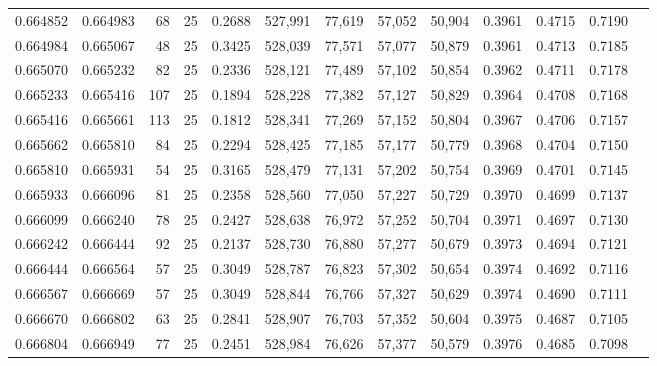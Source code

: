 \begin{tabular}{rrrrrrrrrrrrr}
0.664852 & 0.664983 &    68 &  25 &                                     0.2688 & 527,991 &  77,619 &  57,052 &  50,904 & 0.3961 & 0.4715 & 0.7190 \\
0.664984 & 0.665067 &    48 &  25 &                                     0.3425 & 528,039 &  77,571 &  57,077 &  50,879 & 0.3961 & 0.4713 & 0.7185 \\
0.665070 & 0.665232 &    82 &  25 &                                     0.2336 & 528,121 &  77,489 &  57,102 &  50,854 & 0.3962 & 0.4711 & 0.7178 \\
0.665233 & 0.665416 &   107 &  25 &                                     0.1894 & 528,228 &  77,382 &  57,127 &  50,829 & 0.3964 & 0.4708 & 0.7168 \\
0.665416 & 0.665661 &   113 &  25 &                                     0.1812 & 528,341 &  77,269 &  57,152 &  50,804 & 0.3967 & 0.4706 & 0.7157 \\
0.665662 & 0.665810 &    84 &  25 &                                     0.2294 & 528,425 &  77,185 &  57,177 &  50,779 & 0.3968 & 0.4704 & 0.7150 \\
0.665810 & 0.665931 &    54 &  25 &                                     0.3165 & 528,479 &  77,131 &  57,202 &  50,754 & 0.3969 & 0.4701 & 0.7145 \\
0.665933 & 0.666096 &    81 &  25 &                                     0.2358 & 528,560 &  77,050 &  57,227 &  50,729 & 0.3970 & 0.4699 & 0.7137 \\
0.666099 & 0.666240 &    78 &  25 &                                     0.2427 & 528,638 &  76,972 &  57,252 &  50,704 & 0.3971 & 0.4697 & 0.7130 \\
0.666242 & 0.666444 &    92 &  25 &                                     0.2137 & 528,730 &  76,880 &  57,277 &  50,679 & 0.3973 & 0.4694 & 0.7121 \\
0.666444 & 0.666564 &    57 &  25 &                                     0.3049 & 528,787 &  76,823 &  57,302 &  50,654 & 0.3974 & 0.4692 & 0.7116 \\
0.666567 & 0.666669 &    57 &  25 &                                     0.3049 & 528,844 &  76,766 &  57,327 &  50,629 & 0.3974 & 0.4690 & 0.7111 \\
0.666670 & 0.666802 &    63 &  25 &                                     0.2841 & 528,907 &  76,703 &  57,352 &  50,604 & 0.3975 & 0.4687 & 0.7105 \\
0.666804 & 0.666949 &    77 &  25 &                                     0.2451 & 528,984 &  76,626 &  57,377 &  50,579 & 0.3976 & 0.4685 & 0.7098 \\

\end{tabular}
